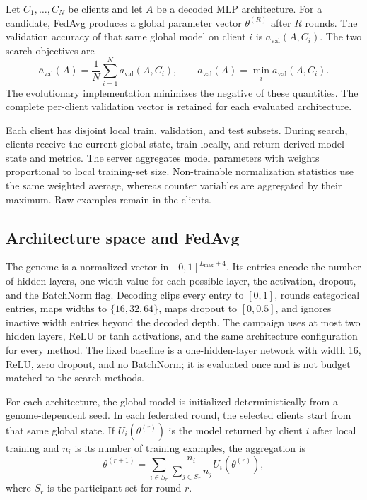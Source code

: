 \documentclass[11pt]{article}
\newcommand{\meanacc}{\overline{a}}
\newcommand{\worstacc}{a}
\begin{document}
Let $C_1,\ldots,C_N$ be clients and let $A$ be a decoded MLP architecture. For a candidate, FedAvg produces a global parameter vector $\theta^{(R)}$ after $R$ rounds. The validation accuracy of that same global model on client $i$ is $a_{\mathrm{val}}(A,C_i)$. The two search objectives are
\begin{equation}
  \meanacc_{\mathrm{val}}(A)=\frac{1}{N}\sum_{i=1}^{N}a_{\mathrm{val}}(A,C_i),
  \qquad
  \worstacc_{\mathrm{val}}(A)=\min_i a_{\mathrm{val}}(A,C_i).
\end{equation}
The evolutionary implementation minimizes the negative of these quantities. The complete per-client validation vector is retained for each evaluated architecture.

Each client has disjoint local train, validation, and test subsets. During search, clients receive the current global state, train locally, and return derived model state and metrics. The server aggregates model parameters with weights proportional to local training-set size. Non-trainable normalization statistics use the same weighted average, whereas counter variables are aggregated by their maximum. Raw examples remain in the clients.

\subsection{Architecture space and FedAvg}

The genome is a normalized vector in $[0,1]^{L_{\max}+4}$. Its entries encode the number of hidden layers, one width value for each possible layer, the activation, dropout, and the BatchNorm flag. Decoding clips every entry to $[0,1]$, rounds categorical entries, maps widths to $\{16,32,64\}$, maps dropout to $[0,0.5]$, and ignores inactive width entries beyond the decoded depth. The campaign uses at most two hidden layers, ReLU or tanh activations, and the same architecture configuration for every method. The fixed baseline is a one-hidden-layer network with width 16, ReLU, zero dropout, and no BatchNorm; it is evaluated once and is not budget matched to the search methods.

For each architecture, the global model is initialized deterministically from a genome-dependent seed. In each federated round, the selected clients start from that same global state. If $U_i(\theta^{(r)})$ is the model returned by client $i$ after local training and $n_i$ is its number of training examples, the aggregation is
\begin{equation}
  \theta^{(r+1)}=\sum_{i\in S_r}\frac{n_i}{\sum_{j\in S_r}n_j}U_i(\theta^{(r)}),
\end{equation}
where $S_r$ is the participant set for round $r$.
\end{document}
